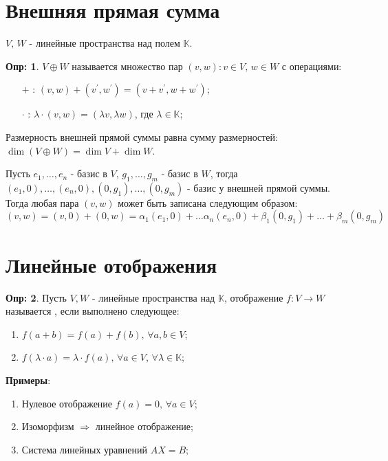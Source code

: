 \documentclass[12pt]{article}
\newcommand{\MK}{\mathbb{K}}
\theoremstyle{definition}
\newtheorem{defn}{Опр:}
\begin{document}

\section*{Внешняя прямая сумма}
$V, \, W$ - линейные пространства над полем $\mathbb{K}$.
\begin{defn}
	 $V \oplus W$ называется множество пар $(v,w) \colon v \in V, \, w \in W$ с операциями:
	\begin{itemize}
		\item[$+$ :] $(v,w) + (v^\prime,w^\prime) = (v + v^\prime, w + w^\prime)$;
		\item[$\cdot$ :] $\lambda{\cdot}(v,w) = (\lambda v, \lambda w)$, где $\lambda \in \mathbb{K}$;
	\end{itemize}
\end{defn}

Размерность внешней прямой суммы равна сумму размерностей: $\dim{(V \oplus W)} = \dim{V} + \dim{W}$.

Пусть $e_1,\dotsc, e_n$ - базис в $V$, $g_1, \dotsc, g_m$ - базис в $W$, тогда $(e_1,0),\dotsc, (e_n,0), (0,g_1),\dotsc, (0,g_m)$ - базис у внешней прямой суммы. Тогда любая пара $(v,w)$ может быть записана следующим образом:
$$
	(v,w) = (v,0) + (0,w) = \alpha_1(e_1,0) + \dotsc \alpha_n(e_n,0) + \beta_1(0,g_1) + \dotsc + \beta_m(0,g_m)
$$
\section*{Линейные отображения}
\begin{defn}
	Пусть $V,W$ - линейные пространства над $\MK$, отображение $f \colon V \to W$ называется , если выполнено следующее:
	\begin{enumerate}[label ={(\arabic*)}]
		\item $f(a + b) = f(a) + f(b), \, \forall a,b \in V$;
		\item $f(\lambda{\cdot}a) = \lambda{\cdot}f(a), \, \forall a \in V, \, \forall \lambda \in \MK$;
	\end{enumerate}
\end{defn}

\textbf{Примеры}:
\begin{enumerate}[label ={(\arabic*)}]
	\item Нулевое отображение $f(a) = 0, \, \forall a \in V$;
	\item Изоморфизм $\Rightarrow$ линейное отображение;
	\item Система линейных уравнений $AX = B$;
\end{enumerate}
\end{document}
